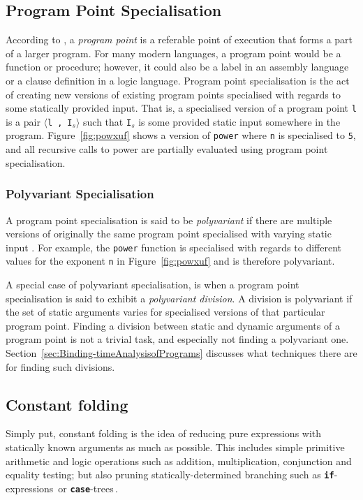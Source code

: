 \documentclass{ituthesis}
\newcommand{\ttdec}[1]{\textcolor{declared-var-color}{\texttt{#1}}}
\newcommand{\ttvar}[1]{\textcolor{local-var-color}{\texttt{#1}}}
\newcommand{\ttliteral}[1]{\textcolor{literal-color}{\texttt{#1}}}
\theoremstyle{break}
\begin{document}
\subsection{Program Point Specialisation}
\label{sub:Program Point Specialisation}
According to \textcite{Jones:1993:PEA:153676}, a \textit{program point} is a referable point of execution that forms a part of a larger program.
For many modern languages, a program point would be a function or procedure; however, it could also be a label in an assembly language or a clause definition in a logic language.
Program point specialisation is the act of creating new versions of existing program points specialised with regards to some statically provided input.
That is, a specialised version of a program point \ttvar{l} is a pair \texttt{$\langle$}\ttvar{l}~\texttt{,}~\ttvar{I$_s$}\texttt{$\rangle$} such that \ttvar{I$_s$} is some provided
static input somewhere in the program.
Figure~\ref{fig:powxuf} shows a version of \ttdec{power} where \ttvar{n} is specialised to \ttliteral{5}, and all recursive calls to power are partially evaluated using program point specialisation.

\subsubsection{Polyvariant Specialisation}
\label{par:PolyvariantSpecialisation}
A program point specialisation is said to be \textit{polyvariant} if there are multiple versions of originally the same program point specialised with varying static input \autocite{Hughes:1999:LNCS:1706,Jones:1993:PEA:153676}.
For example, the \ttdec{power} function is specialised with regards to different values for the exponent \ttvar{n} in Figure~\ref{fig:powxuf} and is therefore polyvariant.

A special case of polyvariant specialisation, is when a program point specialisation is said to exhibit a \textit{polyvariant division}. A division is polyvariant if the set of static arguments varies for specialised versions of that particular program point.
Finding a division between static and dynamic arguments of a program point is not a trivial task, and especially not finding a polyvariant one.
Section~\ref{sec:Binding-timeAnalysisofPrograms} discusses what techniques there are for finding such divisions.


\subsection{Constant folding}
\label{sub:Constant folding}
Simply put, constant folding is the idea of reducing pure expressions with statically known arguments as much as possible.
This includes simple primitive arithmetic and logic operations such as addition, multiplication, conjunction and equality testing; but also pruning statically-determined branching such as \texttt{\textbf{if}}-expressions\,\autocite{Wegman:1991:CPC:103135.103136,Jones:1993:PEA:153676} or \texttt{\textbf{case}}-trees\,\autocite{boquist1999code}.
\end{document}
